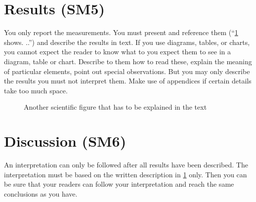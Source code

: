 \section{Results (SM5)}\label{sec:evaluation:results}

You only report the measurements.
You must present and reference them (``\cref{fig:my_label2} shows.
..'') and describe the results in text.
If you use diagrams, tables, or charts, you cannot expect the reader to know what to you expect them to see in a diagram, table or chart.
Describe to them how to read these, explain the meaning of particular elements, point out special observations.
But you may only describe the results you must not interpret them.
Make use of appendices if certain details take too much space.

\begin{figure}
  \centering
  \caption{Another scientific figure that has to be explained in the text}
  \label{fig:my_label2}
\end{figure}

\section{Discussion (SM6)}\label{sec:evaluation:discussion}

An interpretation can only be followed after all results have been described.
The interpretation must be based on the written description in \cref{sec:evaluation:results} only.
Then you can be sure that your readers can follow your interpretation and reach the same conclusions as you have.



